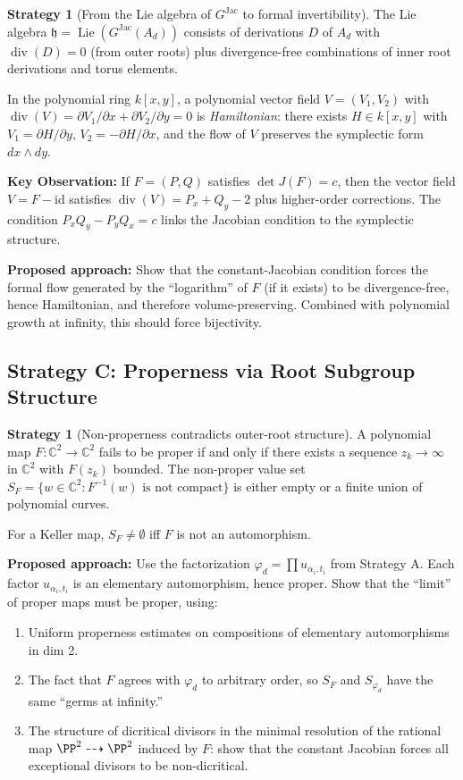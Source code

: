 \documentclass[12pt,a4paper]{article}
\theoremstyle{definition}
\newtheorem{strategy}[theorem]{Strategy}
\newcommand{\CC}{\mathbb{C}}
\newcommand{\kk}{k}
\newcommand{\Lie}{\operatorname{Lie}}
\newcommand{\GJac}{G^{\mathrm{Jac}}}
\newcommand{\divop}{\operatorname{div}}
\begin{document}
\begin{strategy}[From the Lie algebra of $\GJac$ to formal invertibility]
The Lie algebra $\mathfrak{h} = \Lie(\GJac(A_d))$ consists of derivations $D$ of $A_d$ with
$\divop(D) = 0$ (from outer roots) plus divergence-free combinations of inner root
derivations and torus elements.

In the polynomial ring $\kk[x,y]$, a polynomial vector field $V = (V_1, V_2)$ with
$\divop(V) = \partial V_1/\partial x + \partial V_2/\partial y = 0$ is \emph{Hamiltonian}:
there exists $H \in \kk[x,y]$ with $V_1 = \partial H/\partial y$,
$V_2 = -\partial H/\partial x$, and the flow of $V$ preserves the symplectic form
$dx \wedge dy$.

\textbf{Key Observation:} If $F = (P,Q)$ satisfies $\det J(F) = c$, then the vector field
$V = F - \mathrm{id}$ satisfies $\divop(V) = P_x + Q_y - 2$ plus higher-order corrections.
The condition $P_x Q_y - P_y Q_x = c$ links the Jacobian condition to the symplectic
structure.

\textbf{Proposed approach:} Show that the constant-Jacobian condition forces the formal flow
generated by the ``logarithm'' of $F$ (if it exists) to be divergence-free, hence
Hamiltonian, and therefore volume-preserving. Combined with polynomial growth at infinity,
this should force bijectivity.
\end{strategy}

\subsection{Strategy C: Properness via Root Subgroup Structure}

\begin{strategy}[Non-properness contradicts outer-root structure]
A polynomial map $F: \CC^2 \to \CC^2$ fails to be proper if and only if there exists a
sequence $z_k \to \infty$ in $\CC^2$ with $F(z_k)$ bounded. The non-proper value set
$S_F = \{w \in \CC^2 : F^{-1}(w) \text{ is not compact}\}$ is either empty or a
finite union of polynomial curves.

For a Keller map, $S_F \neq \emptyset$ iff $F$ is not an automorphism.

\textbf{Proposed approach:} Use the factorization $\varphi_d = \prod u_{\alpha_i,t_i}$
from Strategy A. Each factor $u_{\alpha_i,t_i}$ is an elementary automorphism, hence proper.
Show that the ``limit'' of proper maps must be proper, using:
\begin{enumerate}
  \item Uniform properness estimates on compositions of elementary automorphisms in dim 2.
  \item The fact that $F$ agrees with $\varphi_d$ to arbitrary order, so $S_F$ and
    $S_{\varphi_d}$ have the same ``germs at infinity.''
  \item The structure of dicritical divisors in the minimal resolution of the rational map
    $\PP^2 \dashrightarrow \PP^2$ induced by $F$: show that the constant Jacobian forces all
    exceptional divisors to be non-dicritical.
\end{enumerate}
\end{strategy}
\end{document}
